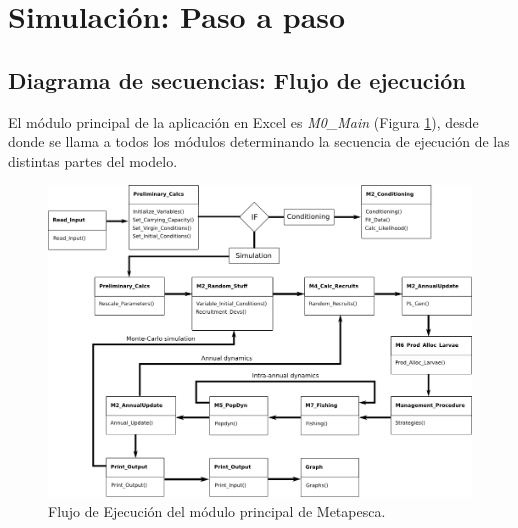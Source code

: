 	\section{Simulación: Paso a paso}
	
		\subsection{Diagrama de secuencias: Flujo de ejecución}
		El módulo principal de la aplicación en Excel es \emph{M0\_Main} (Figura \ref{fig:FlujoEjecucion}), desde donde se llama a todos los módulos determinando la secuencia de ejecución de las distintas partes del modelo.

		\begin{figure}[htb]
		\begin{center}
			\includegraphics[width=\textwidth]{DiagramaMetapesca.png}
		\caption{Flujo de Ejecución del módulo principal de Metapesca.}
		\label{fig:FlujoEjecucion}
		\end{center}
		\end{figure}

